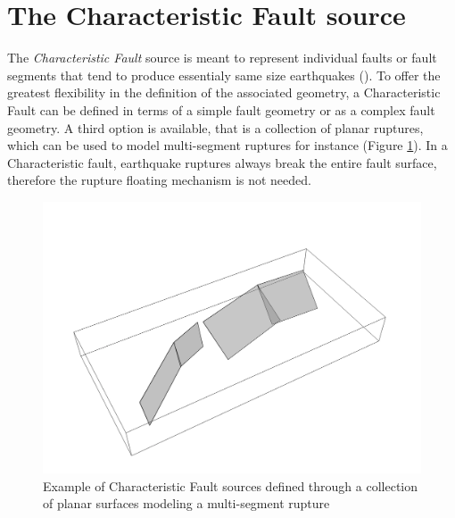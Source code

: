 \section{The Characteristic Fault source}
The \textit{Characteristic Fault} source is meant to represent individual faults or fault segments that tend to
produce essentialy same size earthquakes (\cite{schwartscoppersmith1984}). To offer the greatest flexibility
in the definition of the associated geometry, a Characteristic Fault can be defined in terms of a simple fault
geometry or as a complex fault geometry. A third option is available, that is a collection of planar ruptures,
which can be used to model multi-segment ruptures for instance (Figure \ref{fig:CharacteristicFaultSource}). In a Characteristic fault, earthquake ruptures
always break the entire fault surface, therefore the rupture floating mechanism is not needed.
\begin{figure}
\centering
\includegraphics[width=14cm]{./Pictures/CharacteristicFaultSource.pdf}
\caption{Example of Characteristic Fault sources defined through a collection of planar surfaces modeling a multi-segment rupture}
\label{fig:CharacteristicFaultSource}
\end{figure}
%
%
%

